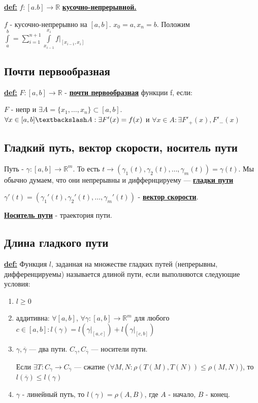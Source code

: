 \documentclass{article}
\newcommand{\integral}[2]{\displaystyle\int\limits_{#1}^{#2}}
\newcommand{\deff}[1]{\underline{\textbf{#1}}}
\begin{document}
\deff{def:} $f:[a.b] \rightarrow \mathbb{R}$ \deff{кусочно-непрерывной.}

$f$ - кусочно-непрерывно на $[a,b]$. $x_0 = a, x_n = b$. Положим $\integral{a}{b} = \sum\limits_{i=1}^{n+1}\integral{x_{i-1}}{x_i}f\Big|_{[x_{i-1},x_i]}$

\subsection{Почти первообразная}

\deff{def:} $F:[a,b] \rightarrow \mathbb{R}$ - \deff{почти первообразная} функции f, если:

$F$ - непр и $\exists A = \{x_1,\ldots,x_n\} \subset[a,b]$.
$\forall x \in [a,b] \textbackslash A: \exists F'(x) = f(x)$ и $\forall x \in A: \exists F'_+(x),F'_-(x)$

\subsection{Гладкий путь, вектор скорости, носитель пути}


Путь - $\gamma :[a,b] \rightarrow \mathbb{R}^m$. То есть $t\rightarrow (\gamma_1(t),\gamma_2(t),\ldots,\gamma_m(t)) = \gamma(t)$. Мы обычно думаем, что они непрерывны и диффернцируему --- \deff{гладки пути}


$\gamma'(t) = (\gamma_1'(t),\gamma_2'(t),\ldots,\gamma_m'(t))$ - \deff{вектор скорости}.

\deff{Носитель пути} - траектория пути.

\subsection{Длина гладкого пути}

\deff{def:} Функция $l$, заданная на множестве гладких путей (непрерывны, дифференцируемы) называется длиной пути, если выполняются следующие условия:

\begin{enumerate}
    \item $l\geq 0$
    \item аддитивна: $\forall [a,b]$, $\forall \gamma:[a,b]\rightarrow\mathbb{R}^m$ для любого $c\in [a,b]: l(\gamma) = l(\gamma\Big|_{[a,c]}) + l(\gamma\Big|_{[c,b]})$
    \item $\gamma, \overline{\gamma}$ --- два пути. $C_{\gamma},C_{\overline{\gamma}}$ --- носители пути.
    
    Если $\exists T: C_{\gamma} \rightarrow C_{\overline{\gamma}}$ --- сжатие ($\forall M,N:\rho(T(M), T(N))\leq \rho(M,N)$), то $l(\overline{\gamma})\leq l(\gamma)$
    \item $\gamma$ - линейный путь, то $l(\gamma) = \rho(A,B)$, где $A$ - начало, $B$ - конец.
\end{enumerate}
\end{document}
